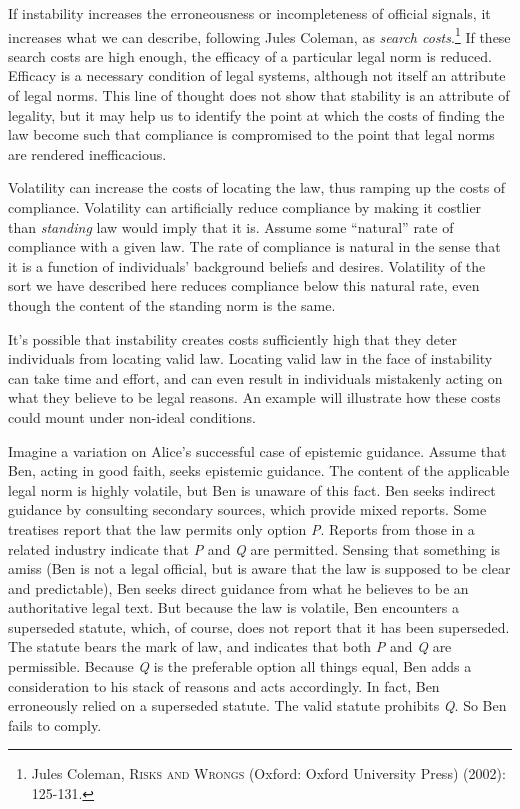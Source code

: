 If instability increases the erroneousness or incompleteness of official
signals, it increases what we can describe, following Jules Coleman, as
\emph{search costs}.\footnote{Jules Coleman, \textsc{Risks and Wrongs}
  (Oxford: Oxford University Press) \textsc{(2002): 125-131.}} If these
search costs are high enough, the efficacy of a particular legal norm is
reduced. Efficacy is a necessary condition of legal systems, although
not itself an attribute of legal norms. This line of thought does not
show that stability is an attribute of legality, but it may help us to
identify the point at which the costs of finding the law become such
that compliance is compromised to the point that legal norms are
rendered inefficacious.

Volatility can increase the costs of locating the law, thus ramping up
the costs of compliance. Volatility can artificially reduce compliance
by making it costlier than \emph{standing} law would imply that it is.
Assume some ``natural'' rate of compliance with a given law. The rate of
compliance is natural in the sense that it is a function of individuals'
background beliefs and desires. Volatility of the sort we have described
here reduces compliance below this natural rate, even though the content
of the standing norm is the same.

It's possible that instability creates costs sufficiently high that they
deter individuals from locating valid law. Locating valid law in the
face of instability can take time and effort, and can even result in
individuals mistakenly acting on what they believe to be legal reasons.
An example will illustrate how these costs could mount under non-ideal
conditions.

Imagine a variation on Alice's successful case of epistemic guidance.
Assume that Ben, acting in good faith, seeks epistemic guidance. The
content of the applicable legal norm is highly volatile, but Ben is
unaware of this fact. Ben seeks indirect guidance by consulting
secondary sources, which provide mixed reports. Some treatises report
that the law permits only option \emph{P}. Reports from those in a
related industry indicate that \emph{P} and \emph{Q} are permitted.
Sensing that something is amiss (Ben is not a legal official, but is
aware that the law is supposed to be clear and predictable), Ben seeks
direct guidance from what he believes to be an authoritative legal text.
But because the law is volatile, Ben encounters a superseded statute,
which, of course, does not report that it has been superseded. The
statute bears the mark of law, and indicates that both \emph{P} and
\emph{Q} are permissible. Because \emph{Q} is the preferable option all
things equal, Ben adds a consideration to his stack of reasons and acts
accordingly. In fact, Ben erroneously relied on a superseded statute.
The valid statute prohibits \emph{Q}. So Ben fails to comply.


